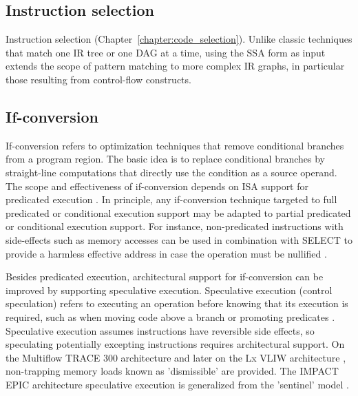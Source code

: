 \subsection{Instruction selection}

Instruction selection (Chapter~\ref{chapter:code_selection}). Unlike
classic techniques that match one IR tree or one DAG at a time, using the SSA
form as input extends the scope of pattern matching to more complex IR graphs,
in particular those resulting from control-flow constructs.

\subsection{If-conversion}

If-conversion refers to optimization techniques that remove conditional branches
from a program region. The basic idea is to replace conditional branches by
straight-line computations that directly use the condition as a source operand.
The scope and effectiveness of if-conversion depends on ISA support for
predicated execution \cite{Mahlke:1995:ISCA}. In principle, any if-conversion
technique targeted to full predicated or conditional execution support may be
adapted to partial predicated or conditional execution support. For instance,
non-predicated instructions with side-effects such as memory accesses can be
used in combination with SELECT to provide a harmless effective address in case
the operation must be nullified \cite{Mahlke:1995:ISCA}.

Besides predicated execution, architectural support for if-conversion can be
improved by supporting speculative execution. Speculative execution (control
speculation) refers to executing an operation before knowing that its execution
is required, such as when moving code above a branch \cite{Lowney:1993:JS} or
promoting predicates \cite{Mahlke:1995:ISCA}.  Speculative execution assumes
instructions have reversible side effects, so speculating potentially excepting
instructions requires architectural support. On the Multiflow TRACE 300
architecture and later on the Lx VLIW architecture \cite{Faraboschi:2000:ISCA},
non-trapping memory loads known as 'dismissible' are provided. The IMPACT EPIC
architecture speculative execution \cite{August:1998:ISCA} is generalized from
the 'sentinel' model \cite{Mahlke:1992:ASPLOS}.

